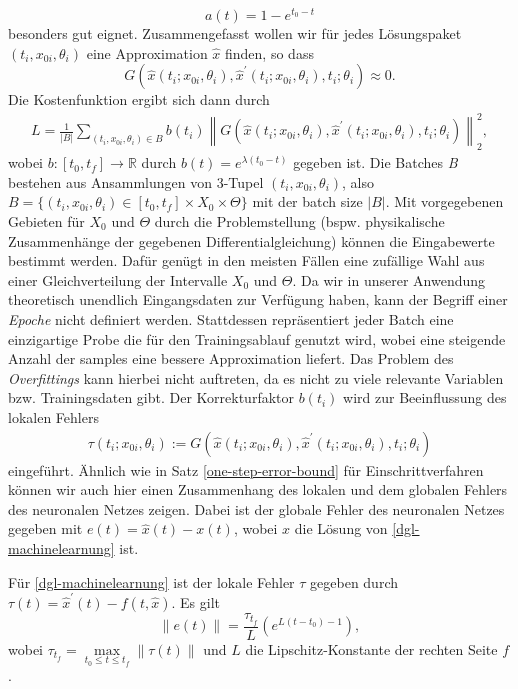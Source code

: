 \[
    a(t) = 1 - e^{t_0-t}
\]
besonders gut eignet. Zusammengefasst wollen wir für jedes Lösungspaket $(t_i,x_{0i}, \theta_i)$ eine Approximation
$\hat{x}$ finden, so dass
\[
    G(\hat{x}(t_i;x_{0i},\theta_i), \hat{x}^{\prime}(t_i;x_{0i},\theta_i),t_i;\theta_i) \approx 0.
\]
Die Kostenfunktion ergibt sich dann durch
\begin{align}
    \label{cost-func}
    L = \frac{1}{|B|} \sum_{(t_i,x_{0i},\theta_i) \in B} b(t_i)
    \left\lVert G(\hat{x}(t_i;x_{0i},\theta_i), \hat{x}^{\prime}(t_i;x_{0i},\theta_i),t_i;\theta_i) \right\rVert_2^2,
\end{align}
wobei $b:[t_0,t_f] \rightarrow \mathbb{R}$ durch $b(t) = e^{\lambda (t_0 - t)}$ gegeben ist. Die Batches \textit{B}
bestehen aus Ansammlungen von 3-Tupel $(t_i,x_{0i},\theta_i)$, also
$B=\{(t_i,x_{0i},\theta_i) \in [t_0,t_f] \times X_0 \times \Theta\}$ mit der batch size $|B|$. Mit vorgegebenen Gebieten
für $X_0$ und $\Theta$ durch die Problemstellung (bspw. physikalische Zusammenhänge der gegebenen Differentialgleichung)
können die Eingabewerte bestimmt werden. Dafür genügt in den meisten Fällen eine zufällige Wahl aus einer
Gleichverteilung der Intervalle $X_0$ und $\Theta$. Da wir in unserer Anwendung theoretisch unendlich Eingangsdaten zur
Verfügung haben, kann der Begriff einer \textit{Epoche} nicht definiert werden. Stattdessen repräsentiert jeder Batch
eine einzigartige Probe die für den Trainingsablauf genutzt wird, wobei eine steigende Anzahl der samples eine bessere
Approximation liefert. Das Problem des \textit{Overfittings} kann hierbei nicht auftreten, da es nicht zu viele
relevante Variablen bzw. Trainingsdaten gibt. Der Korrekturfaktor $b(t_i)$ wird zur Beeinflussung des lokalen Fehlers
\begin{align*}
    \tau(t_i;x_{0i}, \theta_i)
    := G \left( \hat{x}(t_i;x_{0i}, \theta_i), \hat{x}^{\prime}(t_i;x_{0i}, \theta_i),t_i;\theta_i \right)
\end{align*}
eingeführt. Ähnlich wie in Satz \eqref{one-step-error-bound} für Einschrittverfahren können wir auch hier einen
Zusammenhang des lokalen und dem globalen Fehlers des neuronalen Netzes zeigen. Dabei ist der globale Fehler des
neuronalen Netzes gegeben mit $e(t) = \hat{x}(t) - x(t)$, wobei $x$ die Lösung von \eqref{dgl-machinelearnung} ist.
\begin{satz}
    Für \eqref{dgl-machinelearnung} ist der lokale Fehler $\tau$ gegeben durch
    $\tau(t) = \hat{x}^{\prime}(t) - f(t,\hat{x})$. Es gilt
    \[
        \left\lVert e(t) \right\rVert = \frac{\tau_{t_f}}{L} \left( e^{L(t-t_0) - 1} \right),
    \]
    wobei $\tau_{t_f} = \max\limits_{t_0 \leq t \leq t_f} \left\lVert \tau(t) \right\rVert$ und $L$ die
    Lipschitz-Konstante der rechten Seite $f$.
\end{satz}
